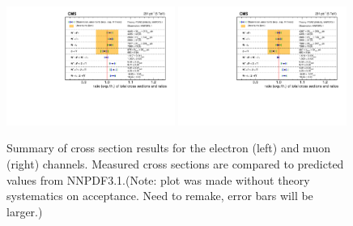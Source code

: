 \begin{figure}[htpb]
\includegraphics[width=0.49\textwidth]{plots/Results/xsecSummary5TeV_ele.pdf}
\includegraphics[width=0.49\textwidth]{plots/Results/xsecSummary5TeV_muon.pdf}
\caption{Summary of cross section results for the \sg electron (left) and muon (right) channels. Measured cross sections are compared to predicted values from NNPDF3.1.(Note: plot was made without theory systematics on acceptance. Need to remake, error bars will be larger.)}
\label{fig:xs:5}
\end{figure}